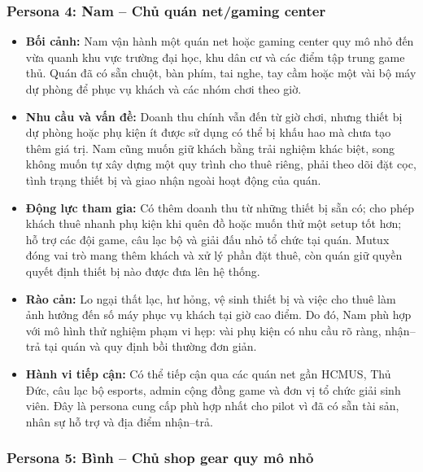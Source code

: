 \subsubsection{Persona 4: Nam -- Chủ quán net/gaming center}

\begin{itemize}
    \item \textbf{Bối cảnh:} Nam vận hành một quán net hoặc gaming center quy mô nhỏ đến vừa quanh khu vực trường đại học, khu dân cư và các điểm tập trung game thủ. Quán đã có sẵn chuột, bàn phím, tai nghe, tay cầm hoặc một vài bộ máy dự phòng để phục vụ khách và các nhóm chơi theo giờ.
    \item \textbf{Nhu cầu và vấn đề:} Doanh thu chính vẫn đến từ giờ chơi, nhưng thiết bị dự phòng hoặc phụ kiện ít được sử dụng có thể bị khấu hao mà chưa tạo thêm giá trị. Nam cũng muốn giữ khách bằng trải nghiệm khác biệt, song không muốn tự xây dựng một quy trình cho thuê riêng, phải theo dõi đặt cọc, tình trạng thiết bị và giao nhận ngoài hoạt động của quán.
    \item \textbf{Động lực tham gia:} Có thêm doanh thu từ những thiết bị sẵn có; cho phép khách thuê nhanh phụ kiện khi quên đồ hoặc muốn thử một setup tốt hơn; hỗ trợ các đội game, câu lạc bộ và giải đấu nhỏ tổ chức tại quán. Mutux đóng vai trò mang thêm khách và xử lý phần đặt thuê, còn quán giữ quyền quyết định thiết bị nào được đưa lên hệ thống.
    \item \textbf{Rào cản:} Lo ngại thất lạc, hư hỏng, vệ sinh thiết bị và việc cho thuê làm ảnh hưởng đến số máy phục vụ khách tại giờ cao điểm. Do đó, Nam phù hợp với mô hình thử nghiệm phạm vi hẹp: vài phụ kiện có nhu cầu rõ ràng, nhận--trả tại quán và quy định bồi thường đơn giản.
    \item \textbf{Hành vi tiếp cận:} Có thể tiếp cận qua các quán net gần HCMUS, Thủ Đức, câu lạc bộ esports, admin cộng đồng game và đơn vị tổ chức giải sinh viên. Đây là persona cung cấp phù hợp nhất cho pilot vì đã có sẵn tài sản, nhân sự hỗ trợ và địa điểm nhận--trả.
\end{itemize}

\subsubsection{Persona 5: Bình -- Chủ shop gear quy mô nhỏ}


